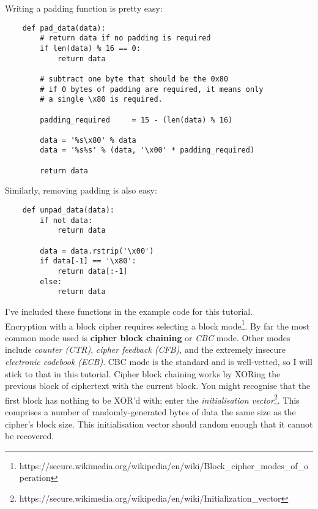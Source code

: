 \documentclass[letterpaper,10pt]{article}
\begin{document}
Writing a padding function is pretty easy:   
\begin{verbatim}
    def pad_data(data):
        # return data if no padding is required
        if len(data) % 16 == 0: 
            return data

        # subtract one byte that should be the 0x80
        # if 0 bytes of padding are required, it means only
        # a single \x80 is required.

        padding_required     = 15 - (len(data) % 16)

        data = '%s\x80' % data
        data = '%s%s' % (data, '\x00' * padding_required)

        return data
\end{verbatim}

Similarly, removing padding is also easy:
\begin{verbatim}
    def unpad_data(data):
        if not data: 
            return data

        data = data.rstrip('\x00')
        if data[-1] == '\x80':
            return data[:-1]
        else:
            return data
\end{verbatim}

I've included these functions in the example code for this tutorial.\\ 


Encryption with a block cipher requires selecting a 
block mode\footnote{https://secure.wikimedia.org/wikipedia/en/wiki/Block\_cipher\_modes\_of\_operation}. 
By far the most common mode used is \textbf{cipher block chaining} or 
\textit{CBC} mode. Other modes include \textit{counter (CTR)}, 
\textit{cipher feedback (CFB)}, and the extremely insecure
\textit{electronic codebook (ECB)}. CBC mode is the standard and is 
well-vetted, so I will stick to that in this tutorial. Cipher block chaining 
works by XORing the previous block of ciphertext with the current block. You 
might recognise that the first block has nothing to be XOR'd with; enter the 
\textit{initialisation vector}\footnote{https://secure.wikimedia.org/wikipedia/en/wiki/Initialization\_vector}. 
This comprises a number of randomly-generated bytes of data the same
size as the cipher's block size. This initialisation vector should random 
enough that it cannot be recovered. 
\end{document}
